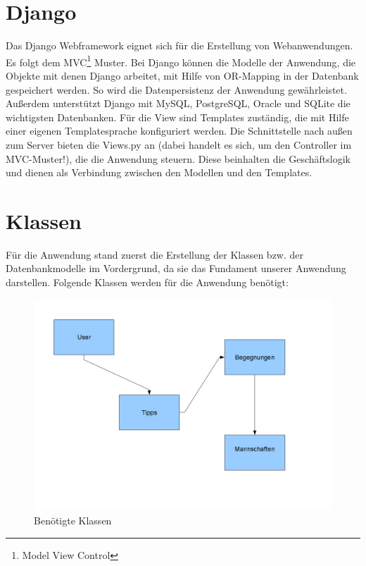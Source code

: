 \section{Django}
Das Django Webframework eignet sich für die Erstellung von Webanwendungen. Es
folgt dem MVC\footnote{Model View Control} Muster. Bei Django können die Modelle
der Anwendung, die Objekte mit denen Django arbeitet, mit Hilfe von OR-Mapping
in der Datenbank gespeichert werden. So wird die Datenpersistenz der Anwendung
gewährleistet. Außerdem unterstützt Django mit MySQL, PostgreSQL, Oracle und 
SQLite die wichtigsten Datenbanken. Für die View sind Templates zuständig, die 
mit Hilfe einer eigenen Templatesprache konfiguriert werden. Die Schnittstelle 
nach außen zum Server bieten die Views.py an (dabei handelt es sich, um den 
Controller im MVC-Muster!), die die Anwendung steuern. Diese beinhalten die 
Geschäftslogik und dienen als Verbindung zwischen den Modellen und den Templates.

\section{Klassen}
Für die Anwendung stand zuerst die Erstellung der Klassen bzw. der
Datenbankmodelle im Vordergrund, da sie das Fundament unserer Anwendung 
darstellen. Folgende Klassen werden für die Anwendung benötigt:

\begin{figure}[ht]
 \begin{center}
  \includegraphics[scale=0.5]{pictures/klassen.png}
 \end{center}
 \caption{Benötigte Klassen}
 \label{klassen}
\end{figure}

